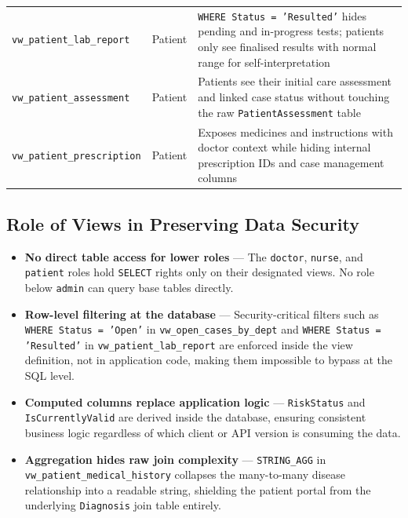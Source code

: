 \documentclass{article}
\begin{document}
\begin{center}
\begin{tabular}{L{3.2cm} C{1.3cm} L{8cm}}
  \texttt{vw\_patient\_lab\_report} & Patient &
  \texttt{WHERE Status = 'Resulted'} hides pending and in-progress tests; patients only see finalised results with normal range for self-interpretation \\

  \texttt{vw\_patient\_assessment} & Patient &
  Patients see their initial care assessment and linked case status without touching the raw \texttt{PatientAssessment} table \\

  \texttt{vw\_patient\_prescription} & Patient &
  Exposes medicines and instructions with doctor context while hiding internal prescription IDs and case management columns \\

\end{tabular}
\end{center}
\subsection{Role of Views in Preserving Data Security}

\begin{itemize}[leftmargin=1.5cm]
    \item \textbf{No direct table access for lower roles} --- The \texttt{doctor}, \texttt{nurse}, and \texttt{patient} roles hold \texttt{SELECT} rights only on their designated views. No role below \texttt{admin} can query base tables directly.

    \item \textbf{Row-level filtering at the database} --- Security-critical filters such as \texttt{WHERE Status = 'Open'} in \texttt{vw\_open\_cases\_by\_dept} and \texttt{WHERE Status = 'Resulted'} in \texttt{vw\_patient\_lab\_report} are enforced inside the view definition, not in application code, making them impossible to bypass at the SQL level.

    \item \textbf{Computed columns replace application logic} --- \texttt{RiskStatus} and \texttt{IsCurrentlyValid} are derived inside the database, ensuring consistent business logic regardless of which client or API version is consuming the data.

    \item \textbf{Aggregation hides raw join complexity} --- \texttt{STRING\_AGG} in \texttt{vw\_patient\_medical\_history} collapses the many-to-many disease relationship into a readable string, shielding the patient portal from the underlying \texttt{Diagnosis} join table entirely.
\end{itemize}
\end{document}
